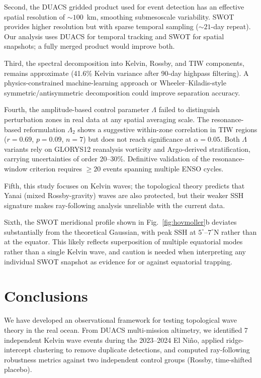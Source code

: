 \documentclass[11pt]{article}
\begin{document}
Second, the DUACS gridded product used for event detection has an effective spatial resolution of ${\sim}100$~km, smoothing submesoscale variability. SWOT provides higher resolution but with sparse temporal sampling (${\sim}21$-day repeat). Our analysis uses DUACS for temporal tracking and SWOT for spatial snapshots; a fully merged product would improve both.

Third, the spectral decomposition into Kelvin, Rossby, and TIW components, remains approximate (41.6\% Kelvin variance after 90-day highpass filtering). A physics-constrained machine-learning approach or Wheeler--Kiladis-style symmetric/antisymmetric decomposition could improve separation accuracy.

Fourth, the amplitude-based control parameter $\Lambda$ failed to distinguish perturbation zones in real data at any spatial averaging scale. The resonance-based reformulation $\Lambda_2$ shows a suggestive within-zone correlation in TIW regions ($r = 0.69$, $p = 0.09$, $n = 7$) but does not reach significance at $\alpha = 0.05$. Both $\Lambda$ variants rely on GLORYS12 reanalysis vorticity and Argo-derived stratification, carrying uncertainties of order 20--30\%. Definitive validation of the resonance-window criterion requires $\geq 20$ events spanning multiple ENSO cycles.

Fifth, this study focuses on Kelvin waves; the topological theory predicts that Yanai (mixed Rossby-gravity) waves are also protected, but their weaker SSH signature makes ray-following analysis unreliable with the current data.

Sixth, the SWOT meridional profile shown in Fig.~\ref{fig:hovmoller}b deviates substantially from the theoretical Gaussian, with peak SSH at $5^\circ$--$7^\circ$N rather than at the equator. This likely reflects superposition of multiple equatorial modes rather than a single Kelvin wave, and caution is needed when interpreting any individual SWOT snapshot as evidence for or against equatorial trapping.

\section{Conclusions}
\label{sec:conclusions}

We have developed an observational framework for testing topological wave theory in the real ocean. From DUACS multi-mission altimetry, we identified 7 independent Kelvin wave events during the 2023--2024 El Ni\~no, applied ridge-intercept clustering to remove duplicate detections, and computed ray-following robustness metrics against two independent control groups (Rossby, time-shifted placebo).
\end{document}
